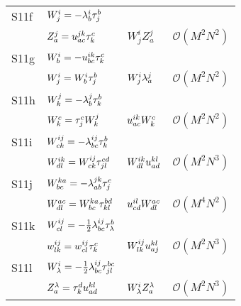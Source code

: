 \begin{center}
\begin{longtable}{@{}llll@{}}
                S11f
                & $W^{i}_{j} = - \lambda^{i}_{b} \tau^{b}_{j}$
                \\
                & $Z^{j}_{a} = u^{jk}_{ac} \tau^{c}_{k}$
                & $W^{i}_{j} Z^{j}_{a}$
                & $\mathcal{O}(M^2 N^2)$
                \\

                S11g
                & $W^{i}_{b} = - u^{ik}_{bc} \tau^{c}_{k}$
                \\
                & $W^{i}_{j} = W^{i}_{b} \tau^{b}_{j}$
                & $W^{i}_{j} \lambda^{j}_{a}$
                & $\mathcal{O}(M^2 N^2)$
                \\

                S11h
                & $W^{j}_{k} = - \lambda^{j}_{b} \tau^{b}_{k}$
                \\
                & $W^{c}_{k} = \tau^{c}_{j} W^{j}_{k}$
                & $u^{ik}_{ac} W^{c}_{k}$
                & $\mathcal{O}(M^2 N^2)$
                \\

                S11i
                & $W^{ij}_{ck} = - \lambda^{ij}_{bc} \tau^{b}_{k}$
                \\
                & $W^{ik}_{dl} = W^{ij}_{ck} \tau^{cd}_{jl}$
                & $W^{ik}_{dl} u^{kl}_{ad}$
                & $\mathcal{O}(M^2 N^3)$
                \\

                S11j
                & $W^{ka}_{bc} = -\lambda^{jk}_{ab} \tau^{c}_{j}$
                \\
                & $W^{ac}_{dl} = W^{ka}_{bc} \tau^{bd}_{kl}$
                & $u^{il}_{cd} W^{ac}_{dl}$
                & $\mathcal{O}(M^4 N^2)$
                \\

                S11k
                & $W^{ij}_{cl} = -\frac{1}{2} \lambda^{ij}_{bc} \tau^{b}_{\lambda}$
                \\
                & $w^{ij}_{lk} = w^{ij}_{cl} \tau^{c}_{k}$
                & $W^{ij}_{lk} u^{kl}_{aj}$
                & $\mathcal{O}(M^2 N^3)$
                \\

                S11l
                & $W^{i}_{\lambda} = -\frac{1}{2} \lambda^{ij}_{bc} \tau^{bc}_{jl}$
                \\
                & $Z^{\lambda}_{a} = \tau^{d}_{k} u^{kl}_{ad}$
                & $W^{i}_{\lambda} Z^{\lambda}_{a}$
                & $\mathcal{O}(M^2 N^3)$
                \\


\end{longtable}
\end{center}
